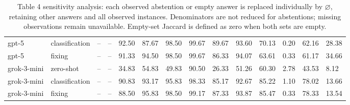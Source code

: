 \begin{table}[!t]
\begin{tabular}{llllllllllllll}
gpt-5 & classification & -- & -- & 92.50 & 87.67 & 98.50 & 99.67 & 89.67 & 93.60 & 70.13 & 0.20 & 62.16 & 28.38 \\
gpt-5 & fixing & -- & -- & 91.33 & 94.50 & 98.50 & 99.67 & 86.33 & 94.07 & 63.61 & 0.33 & 61.17 & 34.66 \\
grok-3-mini & zero-shot & -- & -- & 34.83 & 54.83 & 49.83 & 90.50 & 26.33 & 51.26 & 60.30 & 2.78 & 43.53 & 8.12 \\
grok-3-mini & classification & -- & -- & 90.83 & 93.17 & 95.83 & 98.33 & 85.17 & 92.67 & 85.22 & 1.10 & 78.02 & 13.66 \\
grok-3-mini & fixing & -- & -- & 88.50 & 95.83 & 98.50 & 99.17 & 87.33 & 93.87 & 85.47 & 0.33 & 78.33 & 13.54 \\
\bottomrule
\end{tabular}
\caption{Table 4 sensitivity analysis: each observed abstention or empty answer is replaced individually by $\varnothing$, retaining other answers and all observed instances. Denominators are not reduced for abstentions; missing observations remain unavailable. Empty-set Jaccard is defined as zero when both sets are empty.}
\label{tab:consistency_per_action_filtering}
\end{table}
